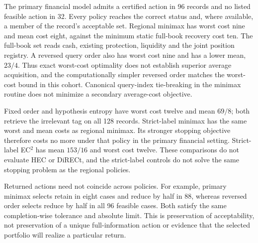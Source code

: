\documentclass[11pt,a4paper]{article}
\theoremstyle{definition}\newtheorem{definition}[theorem]{Definition}
\begin{document}
\begin{table}[!htbp]\centering\small
\caption{Exhaustive acquisition costs. Finance uses 128 records at $\epsilon=2$, $K=25$; inspection uses 16 records. Means use uniform catalogue weights. The strict-label policies ($\dagger$) impose the stronger identification requirement described in Section~\ref{sec:decisionregions}. All policies satisfy the specified conditional action contract.}\label{tab:portfoliocosts}

\end{table}
The primary financial model admits a certified action in 96 records and no listed feasible action in 32. Every policy reaches the correct status and, where available, a member of the record's acceptable set. Regional minimax has worst cost nine and mean cost eight, against the minimum static full-book recovery cost ten. The full-book set reads cash, existing protection, liquidity and the joint position registry. A reversed query order also has worst cost nine and has a lower mean, $23/4$. Thus exact worst-cost optimality does not establish superior average acquisition, and the computationally simpler reversed order matches the worst-cost bound in this cohort. Canonical query-index tie-breaking in the minimax routine does not minimize a secondary average-cost objective.

Fixed order and hypothesis entropy have worst cost twelve and mean $69/8$; both retrieve the irrelevant tag on all 128 records. Strict-label minimax has the same worst and mean costs as regional minimax. Its stronger stopping objective therefore costs no more under that policy in the primary financial setting. Strict-label EC$^2$ has mean $153/16$ and worst cost twelve. These comparisons do not evaluate HEC or DiRECt, and the strict-label controls do not solve the same stopping problem as the regional policies.

Returned actions need not coincide across policies. For example, primary minimax selects retain in eight cases and reduce by half in 88, whereas reversed order selects reduce by half in all 96 feasible cases. Both satisfy the same completion-wise tolerance and absolute limit. This is preservation of acceptability, not preservation of a unique full-information action or evidence that the selected portfolio will realize a particular return.
\end{document}

